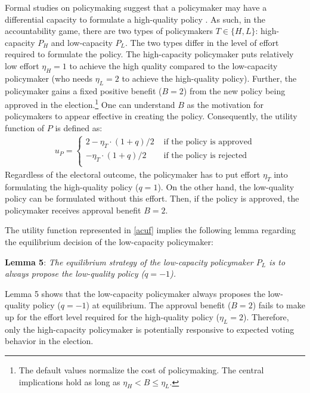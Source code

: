 \documentclass[letterpaper, 12pt]{article}
\begin{document}
    \par Formal studies on policymaking suggest that a policymaker may have a differential capacity to formulate a high-quality policy \cite[e.g.,][]{Gailmard2007slan, Huber2004buca}. As such, in the accountability game, there are two types of policymakers $T \in \{H, L\}$: high-capacity $P_H$ and low-capacity $P_L$. The two types differ in the level of effort required to formulate the policy. The high-capacity policymaker puts relatively low effort $\eta_H = 1$ to achieve the high quality compared to the low-capacity policymaker (who needs $\eta_L = 2$ to achieve the high-quality policy). Further, the policymaker gains a fixed positive benefit ($B=2$) from the new policy being approved in the election.\footnote{The default values normalize the cost of policymaking. The central implications hold as long as $\eta_H < B \leq \eta_L$.} One can understand $B$ as the motivation for policymakers to appear effective in creating the policy. Consequently, the utility function of $P$ is defined as:
    \begin{align}
    u_P = \begin{cases}
    2 - \eta_T \cdot (1+q)/2 &\text{ if the policy is approved} \\
    - \eta_T \cdot (1+q)/2 &\text{ if the policy is rejected} \\
    \end{cases} \label{acuf}
    \end{align}
    \noindent Regardless of the electoral outcome, the policymaker has to put effort $\eta_T$ into formulating the high-quality policy ($q=1$). On the other hand, the low-quality policy can be formulated without this effort. Then, if the policy is approved, the policymaker receives approval benefit $B=2$. 
    
    \par The utility function represented in \autoref{acuf} implies the following lemma regarding the equilibrium decision of the low-capacity policymaker:
    
    \noindent \textbf{Lemma 5}: \textit{The equilibrium strategy of the low-capacity policymaker $P_L$ is to always propose the low-quality policy ($q=-1$).}
    
    \noindent Lemma 5 shows that the low-capacity policymaker always proposes the low-quality policy ($q=-1$) at equilibrium. The approval benefit ($B=2$) fails to make up for the effort level required for the high-quality policy ($\eta_L=2$). Therefore, only the high-capacity policymaker is potentially responsive to expected voting behavior in the election.
    
\end{document}
